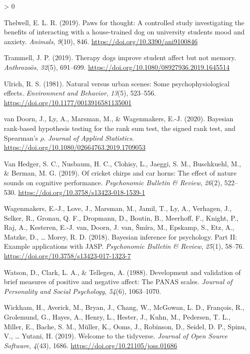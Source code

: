 \documentclass[
  english,
  pub,floatsintext]{apa6}
\newlength{\cslhangindent}
\newenvironment{CSLReferences}[2] %
 {%
  \setlength{\parindent}{0pt}
  \ifodd #1 \everypar{\setlength{\hangindent}{\cslhangindent}}\ignorespaces\fi
  \ifnum #2 > 0
  \setlength{\parskip}{#2\baselineskip}
  \fi
 }%
 {}
\begin{document}
\begin{CSLReferences}{1}{0}
\leavevmode\hypertarget{ref-Thelwell.2019}{}%
Thelwell, E. L. R. (2019). Paws for thought: {A} controlled study investigating the benefits of interacting with a house-trained dog on university students mood and anxiety. \emph{Animals}, \emph{9}(10), 846. \url{https://doi.org/10.3390/ani9100846}

\leavevmode\hypertarget{ref-Trammell.2019}{}%
Trammell, J. P. (2019). Therapy dogs improve student affect but not memory. \emph{Anthrozoös}, \emph{32}(5), 691--699. \url{https://doi.org/10.1080/08927936.2019.1645514}

\leavevmode\hypertarget{ref-Ulrich.1981}{}%
Ulrich, R. S. (1981). Natural versus urban scenes: {Some} psychophysiological effects. \emph{Environment and Behavior}, \emph{13}(5), 523--556. \url{https://doi.org/10.1177/0013916581135001}

\leavevmode\hypertarget{ref-vanDoorn.etal.2020}{}%
van Doorn, J., Ly, A., Marsman, M., \& Wagenmakers, E.-J. (2020). Bayesian rank-based hypothesis testing for the rank sum test, the signed rank test, and {Spearman}'s {\(\rho\)}. \emph{Journal of Applied Statistics}. \url{https://doi.org/10.1080/02664763.2019.1709053}

\leavevmode\hypertarget{ref-VanHedger.etal.2019}{}%
Van Hedger, S. C., Nusbaum, H. C., Clohisy, L., Jaeggi, S. M., Buschkuehl, M., \& Berman, M. G. (2019). Of cricket chirps and car horns: {The} effect of nature sounds on cognitive performance. \emph{Psychonomic Bulletin \& Review}, \emph{26}(2), 522--530. \url{https://doi.org/10.3758/s13423-018-1539-1}

\leavevmode\hypertarget{ref-Wagenmakers.etal.2018}{}%
Wagenmakers, E.-J., Love, J., Marsman, M., Jamil, T., Ly, A., Verhagen, J., Selker, R., Gronau, Q. F., Dropmann, D., Boutin, B., Meerhoff, F., Knight, P., Raj, A., Kesteren, E.-J. van, Doorn, J. van, Šmíra, M., Epskamp, S., Etz, A., Matzke, D., \ldots{} Morey, R. D. (2018). Bayesian inference for psychology. {Part II}: {Example} applications with {JASP}. \emph{Psychonomic Bulletin \& Review}, \emph{25}(1), 58--76. \url{https://doi.org/10.3758/s13423-017-1323-7}

\leavevmode\hypertarget{ref-Watson.etal.1988}{}%
Watson, D., Clark, L. A., \& Tellegen, A. (1988). Development and validation of brief measures of positive and negative affect: The {PANAS} scales. \emph{Journal of Personality and Social Psychology}, \emph{54}(6), 1063--1070.

\leavevmode\hypertarget{ref-R-tidyverse}{}%
Wickham, H., Averick, M., Bryan, J., Chang, W., McGowan, L. D., François, R., Grolemund, G., Hayes, A., Henry, L., Hester, J., Kuhn, M., Pedersen, T. L., Miller, E., Bache, S. M., Müller, K., Ooms, J., Robinson, D., Seidel, D. P., Spinu, V., \ldots{} Yutani, H. (2019). Welcome to the {tidyverse}. \emph{Journal of Open Source Software}, \emph{4}(43), 1686. \url{https://doi.org/10.21105/joss.01686}


\end{CSLReferences}
\end{document}
